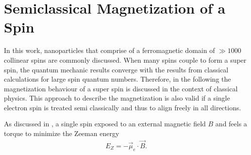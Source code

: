 \documentclass[\main/dresen_thesis.tex]{subfiles}
\begin{document}
\section{Semiclassical Magnetization of a Spin}\label{ch:appendix:calculations:magnetizationClassicalSpin}
In this work, nanoparticles that comprise of a ferromagnetic domain of $\gg 1000$ collinear spins are commonly discussed.
When many spins couple to form a super spin, the quantum mechanic results converge with the results from classical calculations for large spin quantum numbers.
Therefore, in the following the magnetization behaviour of a super spin is discussed in the context of classical physics.
This approach to describe the magnetization is also valid if a single electron spin is treated semi classically and thus to align freely in all directions.

As discussed in , a single spin exposed to an external magnetic field $B$ and feels a torque to minimize the Zeeman energy
\begin{align}
  E_Z = - \vec{\mu}_e \cdot \vec{B}.
\end{align}
\end{document}
